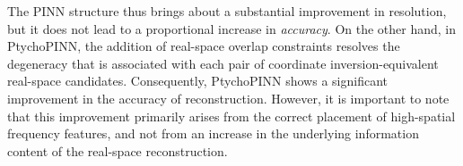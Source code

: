 \documentclass[sn-mathphys]{sn-jnl}%
\theoremstyle{thmstyleone}%
\theoremstyle{thmstyletwo}%
\theoremstyle{thmstylethree}%
\begin{document}
The PINN structure thus brings about a substantial improvement in resolution, but it does not lead to a proportional increase in \emph{accuracy}. On the other hand, in PtychoPINN, the addition of real-space overlap constraints resolves the degeneracy that is associated with each pair of coordinate inversion-equivalent real-space candidates. Consequently, PtychoPINN shows a significant improvement in the accuracy of reconstruction. However, it is important to note that this improvement primarily arises from the correct placement of high-spatial frequency features, and not from an increase in the underlying information content of the real-space reconstruction.

\end{document}
